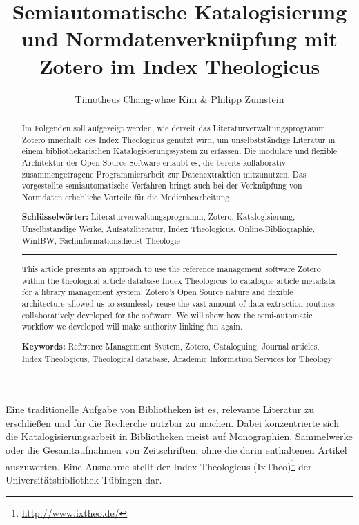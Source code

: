 \documentclass[a4paper,
fontsize=11pt,
oneside,
numbers=noperiodatend,
parskip=half-,
bibliography=totoc,
final
]{scrartcl}
\title{\LARGE{Semiautomatische Katalogisierung und Normdatenverknüpfung mit Zotero im Index Theologicus}} %
\author{Timotheus Chang-whae Kim \& Philipp Zumstein} %
\date{}
\begin{document}
\maketitle
\thispagestyle{fancyplain} 

\begin{abstract}
Im Folgenden soll aufgezeigt werden, wie derzeit das
Literaturverwaltungsprogramm Zotero innerhalb des Index Theologicus
genutzt wird, um unselbstständige Literatur in einem bibliothekarischen
Katalogisierungssystem zu erfassen. Die modulare und flexible
Architektur der Open Source Software erlaubt es, die bereits
kollaborativ zusammengetragene Programmierarbeit zur Datenextraktion
mitzunutzen. Das vorgestellte semiautomatische Verfahren bringt auch bei
der Verknüpfung von Normdaten erhebliche Vorteile für die
Medienbearbeitung.

\textbf{Schlüsselwörter:} Literaturverwaltungsprogramm, Zotero,
Katalogisierung, Unselbständige Werke, Aufsatzliteratur, Index
Theologicus, Online-Bibliographie, WinIBW, Fachinformationsdienst
Theologie

\begin{center}\rule{0.5\linewidth}{\linethickness}\end{center}

This article presents an approach to use the reference management
software Zotero within the theological article database Index
Theologicus to catalogue article metadata for a library management
system. Zotero's Open Source nature and flexible architecture allowed us
to seamlessly reuse the vast amount of data extraction routines
collaboratively developed for the software. We will show how the
semi-automatic workflow we developed will make authority linking fun
again.

\textbf{Keywords:} Reference Management System, Zotero, Cataloguing,
Journal articles, Index Theologicus, Theological database, Academic
Information Services for Theology
\end{abstract}

Eine traditionelle Aufgabe von Bibliotheken ist es, relevante Literatur
zu erschließen und für die Recherche nutzbar zu machen. Dabei
konzentrierte sich die Katalogisierungsarbeit in Bibliotheken meist auf
Monographien, Sammelwerke oder die Gesamtaufnahmen von Zeitschriften,
ohne die darin enthaltenen Artikel auszuwerten. Eine Ausnahme stellt der
Index Theologicus (IxTheo)\footnote{\url{http://www.ixtheo.de/}} der
Universitätsbibliothek Tübingen dar.
\end{document}
